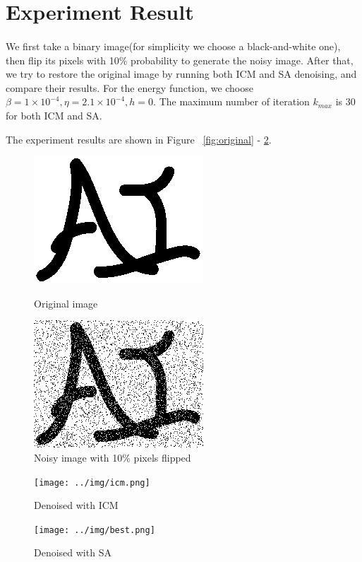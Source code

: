 \documentclass{article}
\begin{document}
\section{Experiment Result}

\paragraph{}
We first take a binary image(for simplicity we choose a black-and-white one), then flip its pixels with 10\% probability to generate the noisy image. After that, we try to restore the original image by running both ICM and SA denoising, and compare their results. For the energy function, we choose $\beta = 1 \times 10^{-4}, \eta = 2.1 \times 10^{-4}, h = 0$. The maximum number of iteration $k_{max}$ is $30$ for both ICM and SA.

The experiment results are shown in Figure ~\ref{fig:original} - \ref{fig:sa}.

\begin{figure}[H]
	\begin{minipage}[b]{0.48\linewidth}
		\centering
		\includegraphics[width=180pt]{../img/in.png}
		\caption{Original image}
		\label{fig:original}
	\end{minipage}
	\begin{minipage}[b]{0.48\linewidth}
		\centering
		\includegraphics[width=180pt]{../img/flipped.png}
		\caption{Noisy image with 10\% pixels flipped}
		\label{fig:noisy}
	\end{minipage}
\end{figure}
\begin{figure}[H]
	\centering
	\begin{minipage}[b]{0.45\linewidth}
		\centering
		\texttt{[image: ../img/icm.png]}
		\caption{Denoised with ICM}
		\label{fig:icm}
	\end{minipage}
	\begin{minipage}[b]{0.45\linewidth}
		\centering
		\texttt{[image: ../img/best.png]}
		\caption{Denoised with SA}
		\label{fig:sa}
	\end{minipage}
\end{figure}
\end{document}
